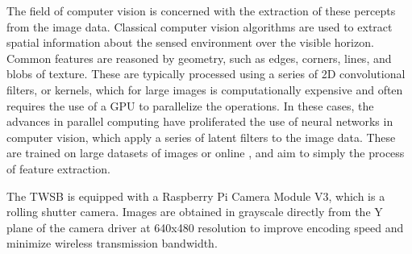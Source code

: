         The field of computer vision is concerned with the extraction of these percepts from the image data. 
        Classical computer vision algorithms are used to extract spatial information about the sensed environment over the visible 
        horizon. Common features are reasoned by geometry, \cite{lee2009geometric} such as edges, corners, lines, and blobs of texture. 
        These are typically processed using a series of 2D convolutional filters, or kernels, which for large images is
        computationally expensive and often requires the use of a GPU to parallelize the operations. In these cases, the
        advances in parallel computing have proliferated the use of neural networks in computer vision, which apply a 
        series of latent filters to the image data. These are trained on large datasets of images 
        or online \cite{tai2017virtual} \cite{lee2013line} \cite{kober2013reinforcement}, and aim to simply the process of feature extraction. 
                
        The TWSB is equipped with a Raspberry Pi Camera Module V3, which is a rolling shutter camera. Images are obtained 
        in grayscale directly from the Y plane of the camera driver at 640x480 resolution to improve encoding speed and 
        minimize wireless transmission bandwidth.

